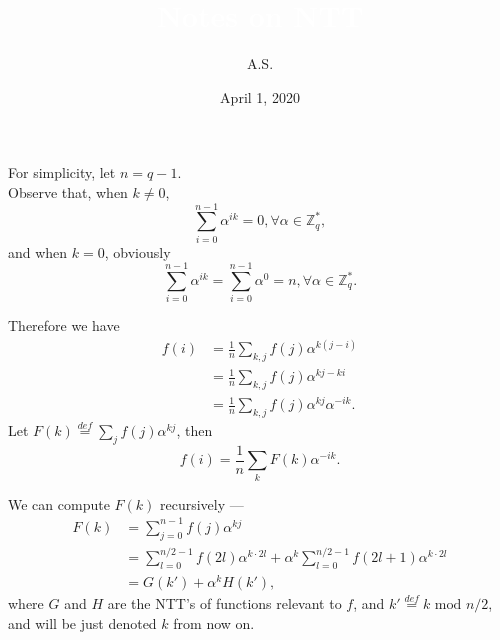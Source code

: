 \documentclass{beamer}	%
\title{\textcolor{white}{Notes on NTT}}
\subtitle{\textcolor{white}{}}
\author{A.S.}
\date{April 1, 2020}
\newcommand{\Z}{\mathbb{Z}}
\theoremstyle{plain}
\theoremstyle{definition}
\theoremstyle{remark}
\numberwithin{equation}{section}
\begin{document}
\begin{frame}
For simplicity, let $n = q - 1$.\\
Observe that, when $k \ne 0$, 
\[
\sum_{i=0}^{n-1}\alpha^{ik} = 0, \forall \alpha \in \Z_q^*,
\]
and when $k = 0$, obviously
\[
\sum_{i=0}^{n-1}\alpha^{ik} = \sum_{i=0}^{n-1}\alpha^0 = n, \forall \alpha \in \Z_q^*.
\]
\end{frame}

\begin{frame}
Therefore we have
\begin{align*}
f(i) & = \frac{1}{n}\sum_{k,j}{f(j)\alpha^{k(j-i)}} \\
     & = \frac{1}{n}\sum_{k,j}{f(j)\alpha^{kj-ki}} \\
     & = \frac{1}{n}\sum_{k,j}{f(j)\alpha^{kj}\alpha^{-ik}}.
\end{align*}
Let $F(k) \overset{def}{=} \sum_{j}{f(j)\alpha^{kj}}$, then
\[
f(i) = \frac{1}{n}\sum_k{F(k)\alpha^{-ik}}.
\]
\end{frame}

\begin{frame}
We can compute $F(k)$ recursively ---
\begin{align*}
F(k) &= \sum_{j=0}^{n-1}{f(j)\alpha^{kj}} \\
     &= \sum_{l=0}^{n/2-1}{f(2l)\alpha^{k \cdot 2l}} + \alpha^{k}\sum_{l=0}^{n/2-1}{f(2l+1)\alpha^{k \cdot 2l}} \\
     &= G(k') + \alpha^{k}H(k'),
\end{align*}
where $G$ and $H$ are the NTT's of functions relevant to $f$, and $k' \overset{def}{=} k \text{ mod } n/2$, and will be just denoted $k$ from now on.
\end{frame}
\end{document}
